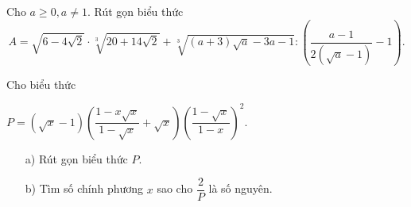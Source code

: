 \begin{bt}
{\begin{enumerate}
		\end{enumerate}
	}
\end{bt}

\begin{bt}%
        Cho $a \ge 0, a \ne 1$. Rút gọn biểu thức $$A= \sqrt{6 - 4\sqrt{2}} \cdot \sqrt[3]{20+ 14 \sqrt{2}} + \sqrt[3]{(a+3) \sqrt{a} -3a -1} \colon \left( \dfrac{a-1}{2 (\sqrt{a}-1)}- 1 \right).$$
    \end{bt}

	\begin{bt}%
		Cho biểu thức 
		
		 $P=(\sqrt{x}-1)\left(\dfrac{1-x\sqrt{x}}{1-\sqrt{x}}+\sqrt{x}\right)\left(\dfrac{1-\sqrt{x}}{1-x}\right)^2 $.
		\begin{enumerate}
			\item [a)] Rút gọn biểu thức $P.$
			\item [b)] Tìm số chính phương $x$ sao cho $\dfrac{2}{P}$ là số nguyên.
		\end{enumerate}
	\end{bt}
